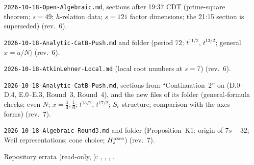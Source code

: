 \documentclass[11pt]{article}
\theoremstyle{definition}
\theoremstyle{plain}
\begin{document}
\begin{enumerate}[label={[S\arabic*]},leftmargin=3em]
\item \texttt{2026-10-18-Open-Algebraic.md}, sections after 19:37 CDT (prime-square theorem; $s=49$; $h$-relation data; $s=121$ factor dimensions; the 21:15 section is superseded) (rev.~6).
\item \texttt{2026-10-18-Analytic-CatB-Push.md} and folder (period $72$; $t^{11/2}$, $t^{13/2}$; general $x=a/N$) (rev.~6).
\item \texttt{2026-10-18-AtkinLehner-Local.md} (local root numbers at $s=7$) (rev.~6).
\item \texttt{2026-10-18-Analytic-CatB-Push.md}, sections from ``Continuation~2'' on (D.0--D.4, E.0--E.3, Round~3, Round~4), and the new files of its folder (general-formula checks; even $N$; $x=\tfrac14,\tfrac16$; $t^{15/2}$, $t^{17/2}$; $S_e$ structure; comparison with the axes forms) (rev.~7).
\item \texttt{2026-10-18-Algebraic-Round3.md} and folder (Proposition~K1; origin of $7s-32$; Weil representations; cone choice; $H_s^{\rm axes}$) (rev.~7).
\end{enumerate}
Repository errata (read-only, ): ,
, ,
.
\end{document}

